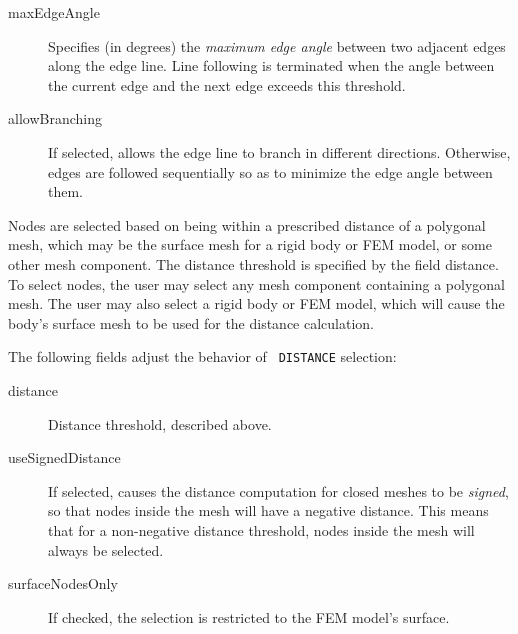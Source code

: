 \documentclass{article}
\begin{document}
\begin{description}
\begin{description}
\item[{\sf maxEdgeAngle}]\mbox{}

Specifies (in degrees) the {\it maximum edge angle} between two
adjacent edges along the edge line. Line following is terminated when
the angle between the current edge and the next edge exceeds this
threshold.

\item[{\sf allowBranching}]\mbox{}

If selected, allows the edge line to branch in different directions.
Otherwise, edges are followed sequentially so as to minimize the edge
angle between them.

\end{description}

\item[DISTANCE]\mbox{}

Nodes are selected based on being within a prescribed distance of a
polygonal mesh, which may be the surface mesh for a rigid body or FEM
model, or some other mesh component. The distance threshold is
specified by the field {\sf distance}. To select nodes, the user may
select any mesh component containing a polygonal mesh.  The user may
also select a rigid body or FEM model, which will cause the body's
surface mesh to be used for the distance calculation.

The following fields adjust the behavior of {\tt
DISTANCE} selection:

\begin{description}

\item[{\sf distance}]\mbox{}

Distance threshold, described above.

\item[{\sf useSignedDistance}]\mbox{}

If selected, causes the distance computation for closed meshes to be
{\it signed}, so that nodes inside the mesh will have a negative
distance.  This means that for a non-negative distance threshold,
nodes inside the mesh will always be selected.

\item[{\sf surfaceNodesOnly}]\mbox{}

If checked, the selection is restricted to the FEM model's surface.

\end{description}

\item[MINIMUM\_PATH]\mbox{}


\end{description}
\end{document}
